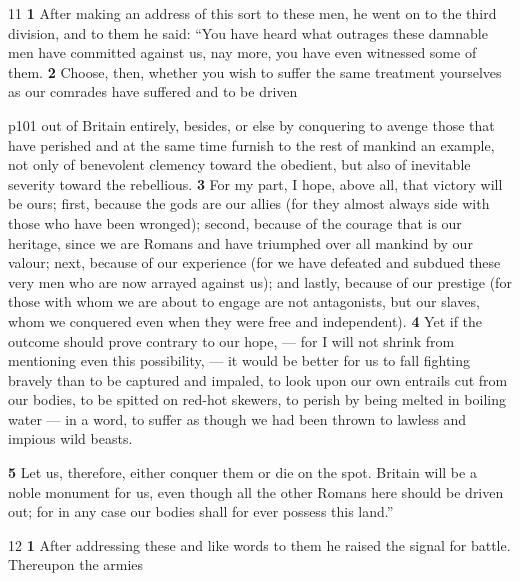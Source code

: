 11
\textbf{1} After making an address of this sort to these men, he went on to the third division, and to them he said: ``You have heard what outrages these damnable men have committed against us, nay more, you have even witnessed some of them. \textbf{2} Choose, then, whether you wish to suffer the same treatment yourselves as our comrades have suffered and to be driven

p101 out of Britain entirely, besides, or else by conquering to avenge those that have perished and at the same time furnish to the rest of mankind an example, not only of benevolent clemency toward the obedient, but also of inevitable severity toward the rebellious. \textbf{3} For my part, I hope, above all, that victory will be ours; first, because the gods are our allies (for they almost always side with those who have been wronged); second, because of the courage that is our heritage, since we are Romans and have triumphed over all mankind by our valour; next, because of our experience (for we have defeated and subdued these very men who are now arrayed against us); and lastly, because of our prestige (for those with whom we are about to engage are not antagonists, but our slaves, whom we conquered even when they were free and independent). \textbf{4} Yet if the outcome should prove contrary to our hope, \texthebrew{—} for I will not shrink from mentioning even this possibility, \texthebrew{—} it would be better for us to fall fighting bravely than to be captured and impaled, to look upon our own entrails cut from our bodies, to be spitted on red-hot skewers, to perish by being melted in boiling water \texthebrew{—} in a word, to suffer as though we had been thrown to lawless and impious wild beasts.

\textbf{5} Let us, therefore, either conquer them or die on the spot. Britain will be a noble monument for us, even though all the other Romans here should be driven out; for in any case our bodies shall for ever possess this land.''

12
\textbf{1} After addressing these and like words to them he raised the signal for battle. Thereupon the armies

